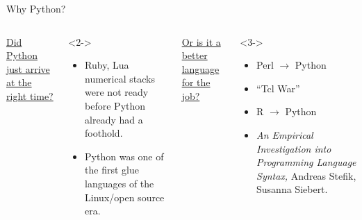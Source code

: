 \documentclass[aspectratio=169]{beamer}
\begin{document}
\begin{frame}{Why Python?}
\large
\vspace{0.5 cm}
\begin{columns}[t]
\underline{Did Python just arrive at the right time?}

\vspace{0.25 cm}
\begin{uncoverenv}<2->
\begin{itemize}
\item Ruby, Lua numerical stacks were not ready before Python already had a foothold.
\item Python was one of the first glue languages of the Linux/open source era.
\end{itemize}
\end{uncoverenv}

\underline{Or is it a better language for the job?}

\vspace{0.25 cm}
\begin{uncoverenv}<3->
\begin{itemize}
\item Perl $\to$ Python
\item ``Tcl War''
\item R $\to$ Python
\item<4-> {\it An Empirical Investigation into Programming Language Syntax,} Andreas Stefik, Susanna Siebert.
\end{itemize}
\end{uncoverenv}
\end{columns}
\end{frame}
\end{document}
